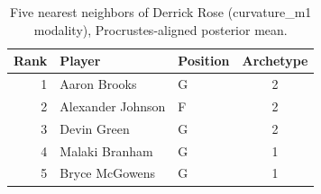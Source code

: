 \begin{table}[htbp]
  \centering\small
  \begin{tabular}{rllc}
    \toprule
    Rank & Player & Position & Archetype \\
    \midrule
    1 & Aaron Brooks & G & 2 \\
    2 & Alexander Johnson & F & 2 \\
    3 & Devin Green & G & 2 \\
    4 & Malaki Branham & G & 1 \\
    5 & Bryce McGowens & G & 1 \\
    \bottomrule
  \end{tabular}
  \caption{Five nearest neighbors of Derrick Rose (curvature_m1 modality), Procrustes-aligned posterior mean.}
  \label{tab:Derrick_Rose_neighbors_curvature_m1}
\end{table}

